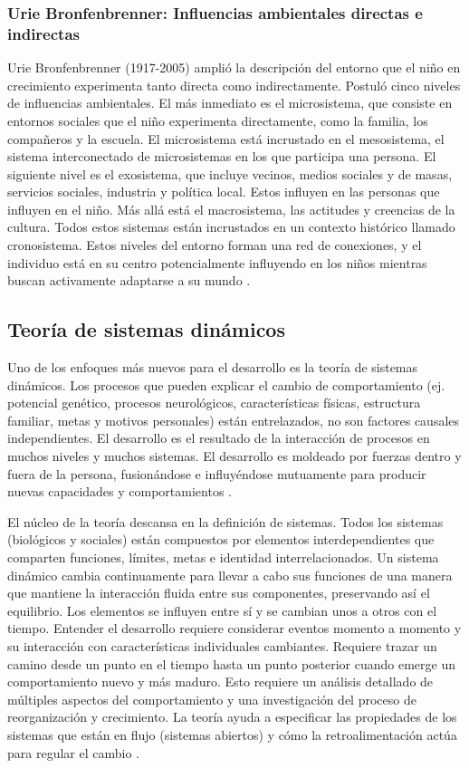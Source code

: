\subsubsection{Urie Bronfenbrenner: Influencias ambientales directas e indirectas}
Urie Bronfenbrenner (1917-2005) amplió la descripción del entorno que el niño
en crecimiento experimenta tanto directa como indirectamente. Postuló cinco
niveles de influencias ambientales. El más inmediato es el microsistema, que
consiste en entornos sociales que el niño experimenta directamente, como la
familia, los compañeros y la escuela. El microsistema está incrustado en el
mesosistema, el sistema interconectado de microsistemas en los que participa una
persona. El siguiente nivel es el exosistema, que incluye vecinos, medios
sociales y de masas, servicios sociales, industria y política local. Estos
influyen en las personas que influyen en el niño. Más allá está el macrosistema,
las actitudes y creencias de la cultura. Todos estos sistemas están incrustados
en un contexto histórico llamado cronosistema. Estos niveles del entorno forman
una red de conexiones, y el individuo está en su centro potencialmente
influyendo en los niños mientras buscan activamente adaptarse a su mundo
\cite{Feldman3}.

\subsection{Teoría de sistemas dinámicos}
Uno de los enfoques más nuevos para el desarrollo es la teoría de sistemas
dinámicos. Los procesos que pueden explicar el cambio de comportamiento (ej.
potencial genético, procesos neurológicos, características físicas,
estructura familiar, metas y motivos personales) están entrelazados, no son
factores causales independientes. El desarrollo es el resultado de la
interacción de procesos en muchos niveles y muchos sistemas. El desarrollo es
moldeado por fuerzas dentro y fuera de la persona, fusionándose e influyéndose
mutuamente para producir nuevas capacidades y comportamientos \cite{Newman2020}.

El núcleo de la teoría descansa en la definición de sistemas. Todos los
sistemas (biológicos y sociales) están compuestos por elementos
interdependientes que comparten funciones, límites, metas e identidad
interrelacionados. Un sistema dinámico cambia continuamente para llevar a cabo
sus funciones de una manera que mantiene la interacción fluida entre sus
componentes, preservando así el equilibrio. Los elementos se influyen entre sí
y se cambian unos a otros con el tiempo. Entender el desarrollo requiere
considerar eventos momento a momento y su interacción con características
individuales cambiantes. Requiere trazar un camino desde un punto en el tiempo
hasta un punto posterior cuando emerge un comportamiento nuevo y más maduro.
Esto requiere un análisis detallado de múltiples aspectos del comportamiento y
una investigación del proceso de reorganización y crecimiento. La teoría ayuda
a especificar las propiedades de los sistemas que están en flujo (sistemas
abiertos) y cómo la retroalimentación actúa para regular el cambio
\cite{Feldman3}.


